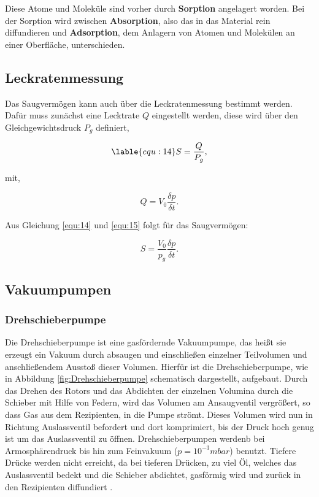 Diese Atome und Moleküle sind vorher durch \textbf{Sorption} angelagert worden.
Bei der Sorption wird zwischen \textbf{Absorption}, also das in das Material rein diffundieren und \textbf{Adsorption}, 
dem Anlagern von Atomen und Molekülen an einer Oberfläche, unterschieden\cite{Buch, S.62,63}.


\subsection{Leckratenmessung}
Das Saugvermögen kann auch über die Leckratenmessung bestimmt werden.
Dafür muss zunächst eine Lecktrate $Q$ eingestellt werden, diese wird über den Gleichgewichtsdruck $P_g$ definiert,

    \begin{equation}
    \lable{equ:14}
        S = \frac{Q}{P_g},
    \end{equation}

mit,

    \begin{equation}
    \label{equ:15}
        Q = V_0 \frac{\delta p}{\delta t}.
    \end{equation}

Aus Gleichung \ref{equ:14} und \ref{equ:15} folgt für das Saugvermögen:

    \begin{equation}
    \label{equ:16}
        S = \frac{V_0}{p_g} \frac{\delta p}{\delta t}.
    \end{equation}
    
\subsection{Vakuumpumpen}
\subsubsection{Drehschieberpumpe}
Die Drehschieberpumpe ist eine gasfördernde Vakuumpumpe, das heißt sie erzeugt ein Vakuum durch absaugen und
einschließen einzelner Teilvolumen und anschließendem Ausstoß dieser Volumen.
Hierfür ist die Drehschieberpumpe, wie in Abbildung \ref{fig:Drehschieberpumpe} schematisch dargestellt, aufgebaut.
Durch das Drehen des Rotors und das Abdichten der einzelnen Volumina durch die Schieber mit Hilfe von Federn, 
wird das Volumen am Ansaugventil vergrößert, so dass Gas aus dem Rezipienten, in die Pumpe strömt. Dieses Volumen wird nun 
in Richtung Auslassventil befordert und dort komprimiert, bis der Druck hoch genug ist um das Auslassventil zu öffnen.
Drehschieberpumpen werdenb bei Armosphärendruck bis hin zum Feinvakuum ($p = 10^{-3} mbar$) benutzt.
Tiefere Drücke werden nicht erreicht, da bei tieferen Drücken, zu viel Öl, welches das Auslassventil bedekt und die Schieber abdichtet, 
gasförmig wird und zurück in den Rezipienten diffundiert \cite{Pfeiffer, S.60,61}. 
    
